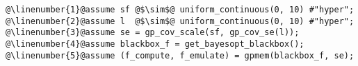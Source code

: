 \begin{mdframed}
\begin{minipage}{\linewidth}
\small
\belowcaptionskip=-10pt
\begin{lstlisting}[caption={Initialize \gpmem\ for Bayesian
optimization},mathescape,numbers=none,label=alg:init_bayesopt,escapechar=\@]
@\linenumber{1}@assume sf @$\sim$@ uniform_continuous(0, 10) #"hyper";
@\linenumber{2}@assume l  @$\sim$@ uniform_continuous(0, 10) #"hyper";
@\linenumber{3}@assume se = gp_cov_scale(sf, gp_cov_se(l));
@\linenumber{4}@assume blackbox_f = get_bayesopt_blackbox();
@\linenumber{5}@assume (f_compute, f_emulate) = gpmem(blackbox_f, se);
\end{lstlisting}

\end{minipage}
\end{mdframed}
